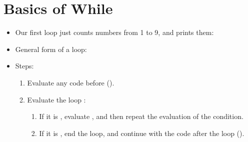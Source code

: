 \documentclass[letterpaper,10pt,english]{sphinxmanual}
\begin{document}
\section{Basics of While}
\label{\detokenize{lecture_notes/lec09_loops1_while:basics-of-while}}\begin{itemize}
\item {} 
Our first  loop just counts numbers from 1 to 9, and prints them:

\begin{sphinxVerbatim}[commandchars=\\\{\}]
  
   
         
\end{sphinxVerbatim}

\item {} 
General form of a  loop:

\begin{sphinxVerbatim}[commandchars=\\\{\}]
 
 
     
 
\end{sphinxVerbatim}

\item {} 
Steps:
\begin{enumerate}
\def\theenumi{\arabic{enumi}}
\def\labelenumi{\theenumi .}
\makeatletter\def\p@enumii{\p@enumi \theenumi .}\makeatother
\item {} 
Evaluate any code before  ().

\item {} 
Evaluate the  loop :
\begin{enumerate}
\def\theenumii{\arabic{enumii}}
\def\labelenumii{\theenumii .}
\makeatletter\def\p@enumiii{\p@enumii \theenumii .}\makeatother
\item {} 
If it is , evaluate , and then repeat
the evaluation of the condition.

\item {} 
If it is , end the loop, and continue with the code
after the loop ().


\end{enumerate}
\end{enumerate}
\end{itemize}
\end{document}
